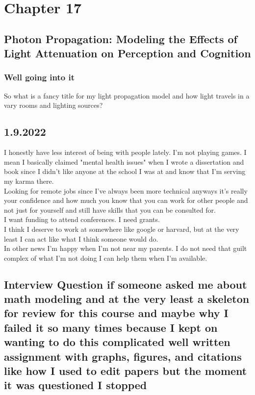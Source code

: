 \chapter{Chapter 17}
\section{Photon Propagation: Modeling the Effects of Light Attenuation on Perception and Cognition}
\subsection{Well going into it}
So what is a fancy title for my light propagation model and how light travels in a vary rooms and lighting sources?  \\ 
\section{1.9.2022}
I honestly have less interest of being with people lately. I'm not playing games. I mean I basically claimed "mental health issues" when I wrote a dissertation and book since I didn't like anyone at the school I was at and know that I'm serving my karma there.
\\
Looking for remote jobs since I've always been more technical anyways it's really your confidence and how much you know that you can work for other people and not just for yourself and still have skills that you can be consulted for. 
\\ 
I want funding to attend conferences. I need grants. \\
I think I deserve to work at somewhere like google or harvard, but at the very least I can act like what I think someone would do. 
\\ 
In other news I'm happy when I'm not near my parents. I do not need that guilt complex of what I'm not doing I can help them when I'm available. 



\section{Interview Question if someone asked me about math modeling and at the very least a skeleton for review for this course and maybe why I failed it so many times because I kept on wanting to do this complicated well written assignment with graphs, figures, and citations like how I used to edit papers but the moment it was questioned I stopped }

